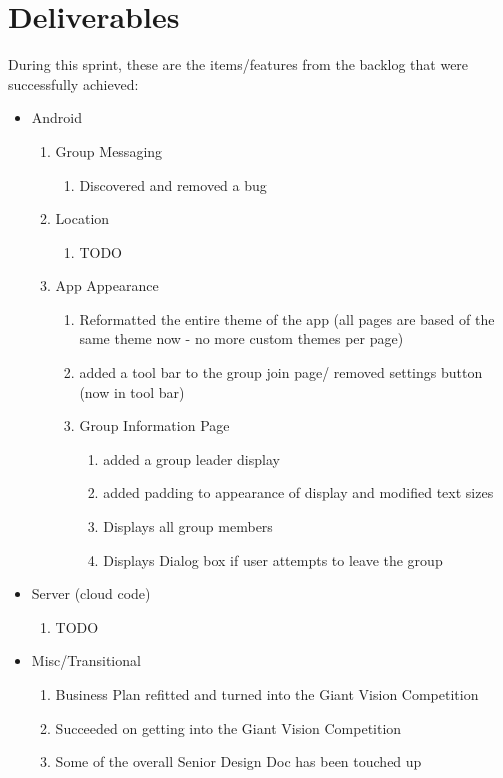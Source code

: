 \documentclass[11pt]{article}
\begin{document}
\section*{Deliverables}
During this sprint, these are the items/features from the backlog that were successfully achieved:
	\begin{itemize}
	\item Android
		\begin{enumerate}
		\item Group Messaging
			\begin{enumerate}
			\item Discovered and removed a bug
			\end{enumerate}
		\item Location
			\begin{enumerate}
			\item TODO
			\end{enumerate}
		\item App Appearance
			\begin{enumerate}
			\item Reformatted the entire theme of the app (all pages are based of the same theme now - no more custom themes per page)
			\item added a tool bar to the group join page/ removed settings button (now in tool bar)
			\item Group Information Page
			\begin{enumerate}
			\item added a group leader display
			\item added padding to appearance of display and modified text sizes
			\item Displays all group members
			\item Displays Dialog box if user attempts to leave the group
			\end{enumerate}
			\end{enumerate}
		\end{enumerate}

	\item Server (cloud code)
		\begin{enumerate}
			\item TODO
		\end{enumerate}
		
	\item Misc/Transitional
		\begin{enumerate}
			\item Business Plan refitted and turned into the Giant Vision Competition
			\item Succeeded on getting into the Giant Vision Competition
			\item Some of the overall Senior Design Doc has been touched up
		\end{enumerate}

	\end{itemize}
\end{document}
